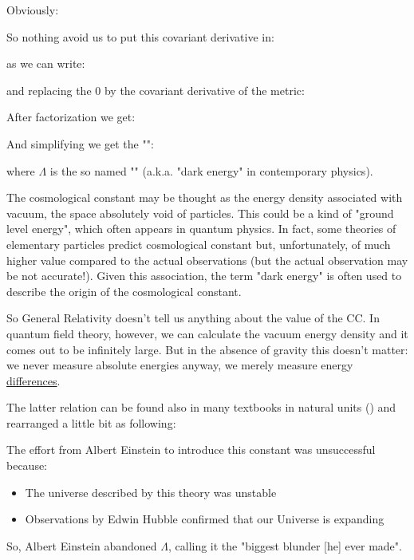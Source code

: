 	Obviously:
	
	So nothing avoid us to put this covariant derivative in:
	
	as we can write:
	
	and replacing the $0$ by the covariant derivative of the metric:
	
	After factorization we get:
	
	And simplifying we get the "":
	
	where $\Lambda$ is the so named "" (a.k.a. "dark energy" in contemporary physics).
	
	The cosmological constant may be thought as the energy density associated with vacuum, the space absolutely void of particles. This could be a kind of "ground level energy", which often appears in quantum physics. In fact, some theories of elementary particles predict cosmological constant but, unfortunately, of much higher value compared to the actual observations (but the actual observation may be not accurate!). Given this association, the term "dark energy" is often used to describe the origin of the cosmological constant.
	
	\begin{tcolorbox}[title=Remark,colframe=black,arc=10pt]
	So General Relativity doesn't tell us anything about the value of the CC. In
quantum field theory, however, we can calculate the vacuum energy density and it comes out to be infinitely large. But in the absence of gravity this doesn't matter: we never measure absolute energies anyway, we merely measure energy \underline{differences}.
	\end{tcolorbox}
	
	The latter relation can be found also in many textbooks in natural units () and rearranged a little bit as following:
	
	The effort from Albert Einstein to introduce this constant was unsuccessful because:
	\begin{itemize}
		\item The universe described by this theory was unstable
		\item Observations by Edwin Hubble confirmed that our Universe is expanding
	\end{itemize}
	So, Albert Einstein abandoned $\Lambda$, calling it the "biggest blunder [he] ever made".

